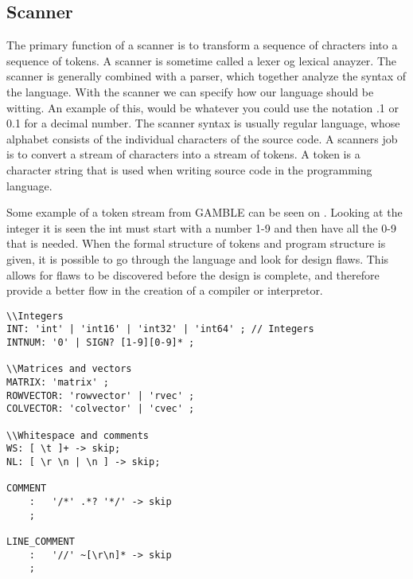 \subsection{Scanner}
The primary function of a scanner is to transform a sequence of chracters into a sequence of tokens.
A scanner is sometime called a lexer og lexical anayzer.
The scanner is generally combined with a parser, which together analyze the syntax of the language.
With the scanner we can specify how our language should be witting. 
An example of this, would be whatever you could use the notation .1 or 0.1 for a decimal number.
The scanner syntax is usually regular language, whose alphabet consists of the individual characters of the source code.
A scanners job is to convert a stream of characters into a stream of tokens.
A token is a character string that is used when writing source code in the programming language.

Some example of a token stream from GAMBLE can be seen on .
Looking at the integer it is seen  the int must start with a number 1-9 and then have all the 0-9 that is needed.
When the formal structure of tokens and program structure is given, it is possible to go through the language and look for design flaws.
This allows for flaws to be discovered before the design is complete, and therefore provide a better flow in the creation of a compiler or interpretor. \citep{Crafting}

\begin{lstlisting}[caption=Example from out Scanner,label={lst:token},numbers=none]
\\Integers
INT: 'int' | 'int16' | 'int32' | 'int64' ; // Integers
INTNUM: '0' | SIGN? [1-9][0-9]* ;

\\Matrices and vectors
MATRIX: 'matrix' ;
ROWVECTOR: 'rowvector' | 'rvec' ;
COLVECTOR: 'colvector' | 'cvec' ;  

\\Whitespace and comments
WS: [ \t ]+ -> skip;
NL: [ \r \n | \n ] -> skip;

COMMENT
    :   '/*' .*? '*/' -> skip
    ;

LINE_COMMENT
    :   '//' ~[\r\n]* -> skip
    ;
\end{lstlisting}